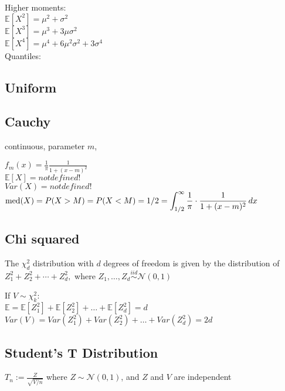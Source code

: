 Higher moments:\\

$\mathbb{E}[X^2] = \mu^2 + \sigma^2$\\
$\mathbb{E}[X^3] = \mu^3 + 3\mu\sigma^2$\\
$\mathbb{E}[X^4] = \mu^4 + 6\mu^2\sigma^2 +3\sigma^4$\\

Quantiles:\\

\subsection*{Uniform}


\subsection*{Cauchy}
continuous, parameter $m$,

$f_ m(x) = \frac{1}{\pi } \frac{1}{1 + (x - m)^2}$\\

$\mathbb{E}[X]=not defined!$\\
$Var(X)=not defined!$\\

$\text {med}(X) = P(X > M) = P(X < M)\\ = 1/2 = \displaystyle \int _{1/2}^{\infty } \frac{1}{\pi } \cdot \frac{1}{1 + (x-m)^2} \,  dx$

\subsection*{Chi squared}
The $\chi _ d^2$ distribution with $d$ degrees of freedom is given by the distribution of $Z_1^2 + Z_2^2 + \cdots + Z_ d^2,$ where $Z_1, \ldots , Z_ d \stackrel{iid}{\sim } \mathcal{N}(0,1)$

If $V \sim \chi^2_k:$\\

$\mathbb{E}= \mathbb{E}[Z_1^2] + \mathbb{E}[Z_2^2] + \ldots + \mathbb{E}[Z_d^2] = d$\\ 

$Var(V) = Var(Z_1^2) + Var(Z_2^2) + \ldots + Var(Z_d^2) = 2d$

\subsection*{Student's T Distribution}

$T_ n := \frac{Z}{\sqrt{V/n}}$ where $Z \sim \mathcal{N}(0,1)$, and $Z$ and $V$ are independent





